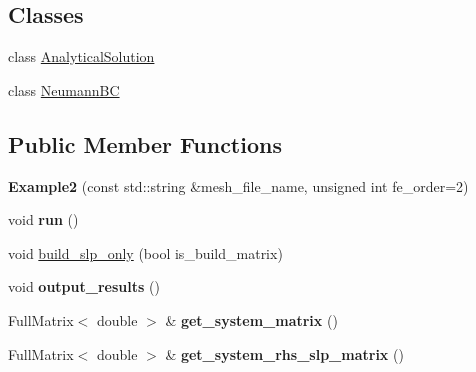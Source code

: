 \subsection*{Classes}
\begin{DoxyCompactItemize}
\item 
class \hyperlink{classLaplaceBEM_1_1Erichsen1996Efficient_1_1Example2_1_1AnalyticalSolution}{Analytical\+Solution}
\item 
class \hyperlink{classLaplaceBEM_1_1Erichsen1996Efficient_1_1Example2_1_1NeumannBC}{Neumann\+BC}
\end{DoxyCompactItemize}
\subsection*{Public Member Functions}
\begin{DoxyCompactItemize}
\item 
\mbox{\label{classLaplaceBEM_1_1Erichsen1996Efficient_1_1Example2_a174f958f5992499c541677385d3fd43b}} 
{\bfseries Example2} (const std\+::string \&mesh\+\_\+file\+\_\+name, unsigned int fe\+\_\+order=2)
\item 
\mbox{\label{classLaplaceBEM_1_1Erichsen1996Efficient_1_1Example2_a05c16fcb30b3c88360ebd13a0e046c9e}} 
void {\bfseries run} ()
\item 
void \hyperlink{classLaplaceBEM_1_1Erichsen1996Efficient_1_1Example2_a4eda45fd98684daa5f951e74c27f0d84}{build\+\_\+slp\+\_\+only} (bool is\+\_\+build\+\_\+matrix)
\item 
\mbox{\label{classLaplaceBEM_1_1Erichsen1996Efficient_1_1Example2_a77575ff8da117097f342daa9e949f9e5}} 
void {\bfseries output\+\_\+results} ()
\item 
\mbox{\label{classLaplaceBEM_1_1Erichsen1996Efficient_1_1Example2_a34f1e4246d2330a0915890f0aef89447}} 
Full\+Matrix$<$ double $>$ \& {\bfseries get\+\_\+system\+\_\+matrix} ()
\item 
\mbox{\label{classLaplaceBEM_1_1Erichsen1996Efficient_1_1Example2_aa29d813b54f41c70f187ae97b665e532}} 
Full\+Matrix$<$ double $>$ \& {\bfseries get\+\_\+system\+\_\+rhs\+\_\+slp\+\_\+matrix} ()

\end{DoxyCompactItemize}
